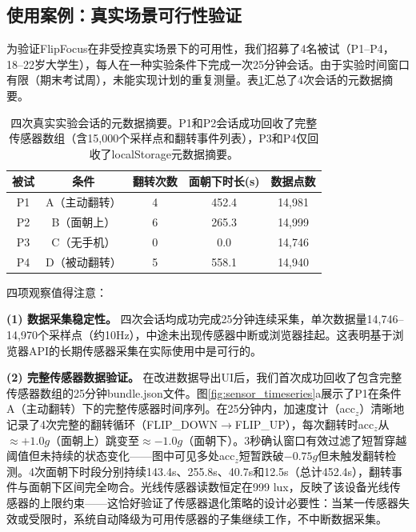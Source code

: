 \documentclass[12pt,a4paper]{ctexart}
\begin{document}
\subsection{使用案例：真实场景可行性验证}

为验证FlipFocus在非受控真实场景下的可用性，我们招募了4名被试（P1--P4，18--22岁大学生），每人在一种实验条件下完成一次25分钟会话。由于实验时间窗口有限（期末考试周），未能实现计划的重复测量。表\ref{tab:real_sessions}汇总了4次会话的元数据摘要。

\begin{table}[H]
\centering
\caption{四次真实实验会话的元数据摘要。P1和P2会话成功回收了完整传感器数组（含\raisebox{0.5ex}{\tiny\textasciitilde}15,000个采样点和翻转事件列表），P3和P4仅回收了localStorage元数据摘要。}
\label{tab:real_sessions}
\begin{tabular}{@{}ccccc@{}}
\toprule
\textbf{被试} & \textbf{条件} & \textbf{翻转次数} & \textbf{面朝下时长(s)} & \textbf{数据点数} \\
\midrule
P1 & A（主动翻转） & 4 & 452.4 & 14,981 \\
P2 & B（面朝上）   & 6 & 265.3 & 14,999 \\
P3 & C（无手机）   & 0 & 0.0   & 14,746 \\
P4 & D（被动翻转） & 5 & 558.1 & 14,940 \\
\bottomrule
\end{tabular}
\end{table}

四项观察值得注意：

\textbf{(1) 数据采集稳定性。} 四次会话均成功完成25分钟连续采集，单次数据量14,746--14,970个采样点（约10Hz），中途未出现传感器中断或浏览器挂起。这表明基于浏览器API的长期传感器采集在实际使用中是可行的。

\textbf{(2) 完整传感器数据验证。} 在改进数据导出UI后，我们首次成功回收了包含完整传感器数组的25分钟bundle.json文件。图\ref{fig:sensor_timeseries}a展示了P1在条件A（主动翻转）下的完整传感器时间序列。在25分钟内，加速度计（acc$_z$）清晰地记录了4次完整的翻转循环（FLIP\_DOWN$\rightarrow$FLIP\_UP），每次翻转时acc$_z$从$\approx+1.0g$（面朝上）跳变至$\approx-1.0g$（面朝下）。3秒确认窗口有效过滤了短暂穿越阈值但未持续的状态变化——图中可见多处acc$_z$短暂跌破$-0.75g$但未触发翻转检测。4次面朝下时段分别持续143.4s、255.8s、40.7s和12.5s（总计452.4s），翻转事件与面朝下区间完全吻合。光线传感器读数恒定在999 lux，反映了该设备光线传感器的上限约束——这恰好验证了传感器退化策略的设计必要性：当某一传感器失效或受限时，系统自动降级为可用传感器的子集继续工作，不中断数据采集。
\end{document}
